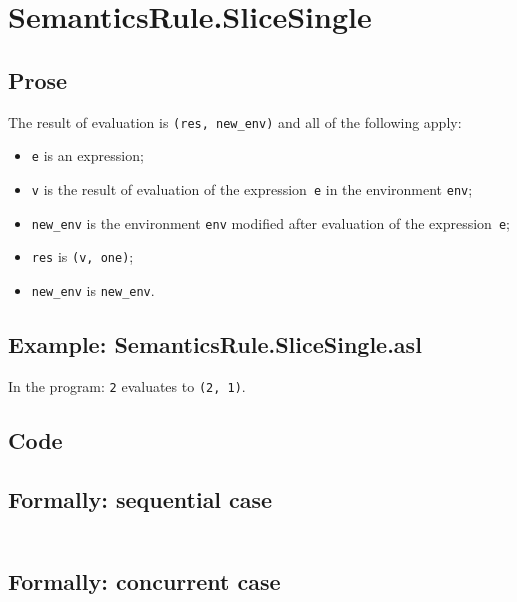 \documentclass{book}
\begin{document}
\section{SemanticsRule.SliceSingle \label{sec:SemanticsRule.SliceSingle}}

  \subsection{Prose}
  The result of evaluation is \texttt{(res, new\_env)} and all
of the following apply:
  \begin{itemize}
  \item \texttt{e} is an expression;
  \item \texttt{v} is the result of evaluation of the expression~\texttt{e} in the environment \texttt{env};
  \item \texttt{new\_env} is the environment \texttt{env} modified after evaluation of the expression~\texttt{e};
  \item \texttt{res} is \texttt{(v, one)};
  \item \texttt{new\_env} is \texttt{new\_env}.
  \end{itemize}

  \subsection{Example: SemanticsRule.SliceSingle.asl}
  In the program:
  \texttt{2} evaluates to \texttt{(2, 1)}.

  \subsection{Code}

  \subsection{Formally: sequential case}
  \begin{align}
  \end{align} 

  \subsection{Formally: concurrent case}
  \begin{align}
  \end{align} 
\end{document}
